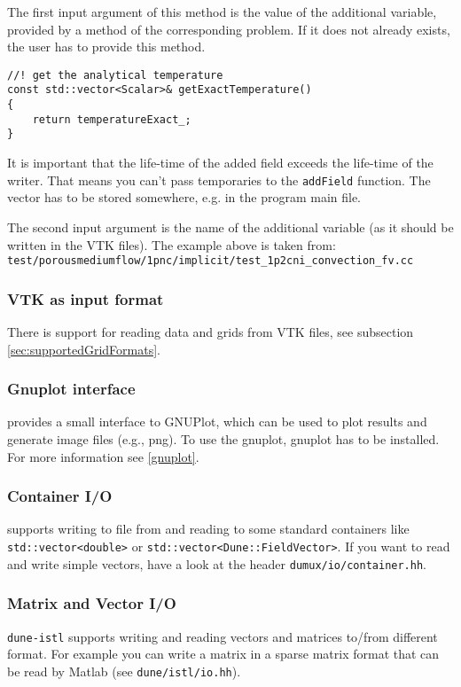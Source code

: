 The first input argument of this method is the value of the additional variable, provided by a method of the corresponding problem.
If it does not already exists, the user has to provide this method.
\begin{lstlisting}[style=DumuxCode]
//! get the analytical temperature
const std::vector<Scalar>& getExactTemperature()
{
    return temperatureExact_;
}
\end{lstlisting}
It is important that the life-time of the added field exceeds the life-time of the writer. That means you can't pass temporaries
to the \texttt{addField} function. The vector has to be stored somewhere, e.g. in the program main file.

The second input argument is the name of the additional variable (as it should be written in the VTK files).
The example above is taken from: \\ \texttt{test/porousmediumflow/1pnc/implicit/test\_1p2cni\_convection\_fv.cc}

\subsubsection{VTK as input format}
There is support for reading data and grids from VTK files, see subsection \ref{sec:supportedGridFormats}.

\subsubsection{Gnuplot interface}
\Dumux provides a small interface to GNUPlot, which can be used to plot results and generate
image files (e.g., png). To use the gnuplot, gnuplot has to be installed. For more information see \ref{gnuplot}.

\subsubsection{Container I/O}
\Dumux supports writing to file from and reading to some standard \Cplusplus containers like \texttt{std::vector<double>} or \texttt{std::vector<Dune::FieldVector>}.
If you want to read and write simple vectors, have a look at the header \texttt{dumux/io/container.hh}.

\subsubsection{Matrix and Vector I/O}
\texttt{dune-istl} supports writing and reading vectors and matrices to/from different format. For example you can write a matrix in a sparse matrix format that
can be read by Matlab (see \texttt{dune/istl/io.hh}).
